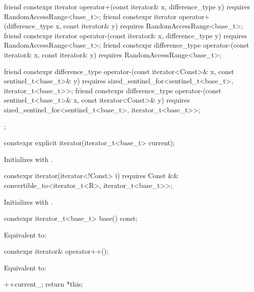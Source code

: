 \begin{codeblock}
{{    friend constexpr iterator operator+(const iterator& x, difference_type y)
      requires RandomAccessRange<base_t>;
    friend constexpr iterator operator+(difference_type x, const iterator& y)
      requires RandomAccessRange<base_t>;
    friend constexpr iterator operator-(const iterator& x, difference_type y)
      requires RandomAccessRange<base_t>;
    friend constexpr difference_type operator-(const iterator& x, const iterator& y)
      requires RandomAccessRange<base_t>;

    friend constexpr difference_type
      operator-(const iterator<Const>& x, const sentinel_t<base_t>& y)
        requires sized_sentinel_for<sentinel_t<base_t>, iterator_t<base_t>>;
    friend constexpr difference_type
      operator-(const sentinel_t<base_t>& x, const iterator<Const>& y)
        requires sized_sentinel_for<sentinel_t<base_t>, iterator_t<base_t>>;
  };
}
\end{codeblock}

\begin{itemdecl}
constexpr explicit iterator(iterator_t<base_t> current);
\end{itemdecl}

\begin{itemdescr}
\pnum
\effects
Initializes  with .
\end{itemdescr}

\begin{itemdecl}
constexpr iterator(iterator<!Const> i)
  requires Const && convertible_to<iterator_t<R>, iterator_t<base_t>>;
\end{itemdecl}

\begin{itemdescr}
\pnum
\effects
Initializes  with .
\end{itemdescr}

\begin{itemdecl}
constexpr iterator_t<base_t> base() const;
\end{itemdecl}

\begin{itemdescr}
\pnum
\effects
Equivalent to: 
\end{itemdescr}

\begin{itemdecl}
constexpr iterator& operator++();
\end{itemdecl}

\begin{itemdescr}
\pnum
\effects Equivalent to:
\begin{codeblock}
++current_;
return *this;
\end{codeblock}
\end{itemdescr}

